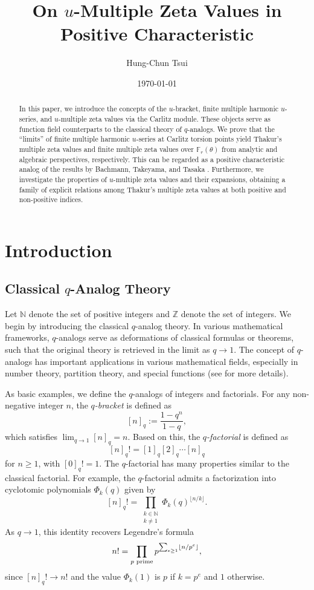 \documentclass[12pt,reqno]{amsart}
\title[On {\protect\lowercase{$u$}}-Multiple Zeta Values in Positive Characteristic]
{On {\protect\lowercase{$u$}}-Multiple Zeta Values in Positive Characteristic}
\author[H.-C. Tsui]{Hung-Chun Tsui}
\date{\today}
\numberwithin{equation}{section}
\theoremstyle{plain}
\theoremstyle{definition}
\theoremstyle{remark}
\newcommand{\ZZ}{\mathbb{Z}}
\newcommand{\NN}{\mathbb{N}}
\DeclarePairedDelimiter\floor{\lfloor}{\rfloor}
\begin{document}
\begin{abstract}
In this paper, we introduce the concepts of the $u$-bracket, finite multiple harmonic $u$-series, and $u$-multiple zeta values via the Carlitz module. These objects serve as function field counterparts to the classical theory of $q$-analogs. We prove that the ``limits'' of finite multiple harmonic $u$-series at Carlitz torsion points yield Thakur's multiple zeta values and finite multiple zeta values over $\mathbb{F}_r(\theta)$ from analytic and algebraic perspectives, respectively. This can be regarded as a positive characteristic analog of the results by Bachmann, Takeyama, and Tasaka \cite{BTT18}. Furthermore, we investigate the properties of $u$-multiple zeta values and their expansions, obtaining a family of explicit relations among Thakur's multiple zeta values at both positive and non-positive indices.
\end{abstract}
\maketitle
\tableofcontents
\section{Introduction}
\subsection{Classical \texorpdfstring{$q$}{q}-Analog Theory}

Let $\NN$ denote the set of positive integers and $\ZZ$ denote the set of integers. We begin by introducing the classical $q$-analog theory. In various mathematical frameworks, $q$-analogs serve as deformations of classical formulas or theorems, such that the original theory is retrieved in the limit as $q \to 1$. The concept of $q$-analogs has important applications in various mathematical fields, especially in number theory, partition theory, and special functions (see \cite{GR2004, andrews1976theory} for more details).

As basic examples, we define the $q$-analogs of integers and factorials. For any non-negative integer $n$, the \textit{$q$-bracket} is defined as
$$[n]_q := \frac{1-q^n}{1-q},$$
which satisfies $\lim_{q \to 1} [n]_q = n$. Based on this, the \textit{$q$-factorial} is defined as
$$[n]_q! = [1]_q [2]_q \cdots [n]_q$$
for $n \geq 1$, with $[0]_q! = 1$. The $q$-factorial has many properties similar to the classical factorial. For example, the $q$-factorial admits a factorization into cyclotomic polynomials $\Phi_k(q)$ given by$$[n]_q! = \prod_{\substack{k\in\NN\\k\neq 1}} \Phi_k(q)^{\lfloor n/k \rfloor}.$$
As $q \to 1$, this identity recovers Legendre's formula
$$
n!=\prod_{p\text{ prime}}p^{\sum_{e\geq 1}\floor{n/p^e}},
$$
since $[n]_q! \to n!$ and the value $\Phi_k(1)$ is $p$ if $k=p^e$ and $1$ otherwise.
\end{document}
